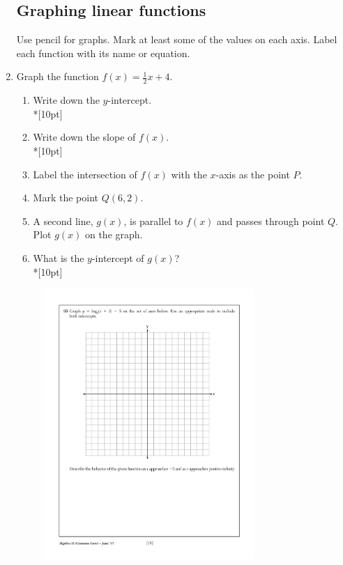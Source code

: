 \documentclass[]{book}
\begin{document}
\begin{enumerate}
\begin{enumerate}
\end{enumerate}


\newpage
\subsection*{Graphing linear functions}
Use pencil for graphs. Mark at least some of the values on each axis. Label each function with its name or equation. 
\item Graph the function $f(x)=\frac{1}{2}x+4$. 
\begin{enumerate}
    \item Write down the $y$-intercept.\\*[10pt]
    \item Write down the slope of $f(x)$.\\*[10pt]
    \item Label the intersection of $f(x)$ with the $x$-axis as the point $P$.
    \item Mark the point $Q (6, 2)$.
    \item A second line, $g(x)$, is parallel to $f(x)$ and passes through point $Q$. Plot $g(x)$ on the graph.
    \item What is the $y$-intercept of $g(x)$?\\*[10pt]
\end{enumerate}

\begin{figure}[!ht]
    \centering
    \includegraphics[width=0.75\textwidth]{regents-grid.pdf}
\end{figure}


\end{enumerate}
\end{document}
